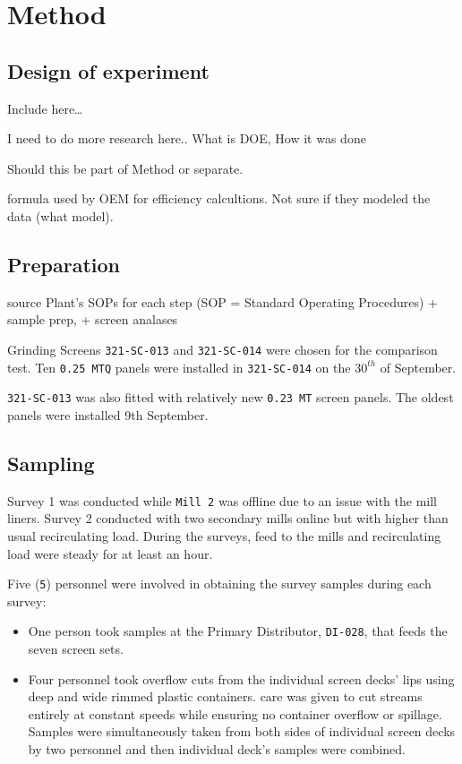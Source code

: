 \documentclass[
]{article}
\begin{document}
\hypertarget{method}{%
\section{Method}\label{method}}

\hypertarget{design-of-experiment}{%
\subsection{Design of experiment}\label{design-of-experiment}}

Include here\ldots{}

I need to do more research here.. What is DOE, How it was done

Should this be part of Method or separate.

formula used by OEM for efficiency calcultions. Not sure if they modeled
the data (what model).

\hypertarget{preparation}{%
\subsection{Preparation}\label{preparation}}

source Plant's SOPs for each step (SOP = Standard Operating Procedures)
+ sample prep, + screen analases

Grinding Screens \texttt{321-SC-013} and \texttt{321-SC-014} were chosen
for the comparison test. Ten \texttt{0.25\ MTQ} panels were installed in
\texttt{321-SC-014} on the \(30^{th}\) of September.

\texttt{321-SC-013} was also fitted with relatively new
\texttt{0.23\ MT} screen panels. The oldest panels were installed 9th
September.

\hypertarget{sampling}{%
\subsection{Sampling}\label{sampling}}

Survey 1 was conducted while \texttt{Mill\ 2} was offline due to an
issue with the mill liners. Survey 2 conducted with two secondary mills
online but with higher than usual recirculating load. During the
surveys, feed to the mills and recirculating load were steady for at
least an hour.

Five (\texttt{5}) personnel were involved in obtaining the survey
samples during each survey:

\begin{itemize}
\item
  One person took samples at the Primary Distributor, \texttt{DI-028},
  that feeds the seven screen sets.
\item
  Four personnel took overflow cuts from the individual screen decks'
  lips using deep and wide rimmed plastic containers. care was given to
  cut streams entirely at constant speeds while ensuring no container
  overflow or spillage. Samples were simultaneously taken from both
  sides of individual screen decks by two personnel and then individual
  deck's samples were combined.
\end{itemize}
\end{document}

